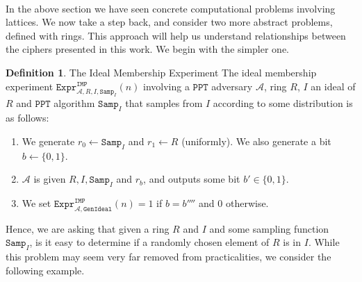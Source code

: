 \documentclass{article}
\theoremstyle{definition}
\newtheorem{definition}{Definition}[section]
\theoremstyle{example}
\newcommand{\A}{\mathcal{A}}
\newcommand{\PPT}{\texttt{PPT}}
\newcommand{\Expr}[2]{\texttt{Expr}^{\texttt{#1}}_{#2}}
\newcommand{\GenIdeal}{\texttt{GenIdeal}}
\newcommand{\Samp}{\texttt{Samp}}
\begin{document}
\paragraph{} In the above section we have seen concrete computational problems
involving lattices. We now take a step back, and consider two more abstract
problems, defined with rings. This approach will help us understand
relationships between the ciphers presented in this work. We begin with the
simpler one.
\begin{definition}{The Ideal Membership Experiment} The ideal membership experiment
  $\Expr{IMP}{\A, R, I, \Samp_I}(n)$ involving a $\PPT$ adversary $\A$, ring $R$, $I$ an
  ideal of $R$ and $\PPT$ algorithm $\Samp_I$ that samples from $I$
  according to some distribution is as follows:
  \begin{enumerate}
  \item We generate $r_0 \leftarrow \Samp_I$ and $r_1 \leftarrow R$ (uniformly).
    We also generate a bit $b \leftarrow \{0, 1\}$. 
  \item $\A$ is given $R, I, \Samp_I$ and $r_b$, and outputs some bit $b' \in \{0, 1\}$.
  \item We set $\Expr{IMP}{\A, \GenIdeal}(n) = 1$ if $b = b''''$ and $0$ otherwise.
  \end{enumerate}
\end{definition}
Hence, we are asking that given a ring $R$ and $I$ and some sampling function
$\Samp_I$, is it easy to determine if a randomly chosen element of $R$ is in
$I$. While this problem may seem very far removed from practicalities, we
consider the following example.
\end{document}
